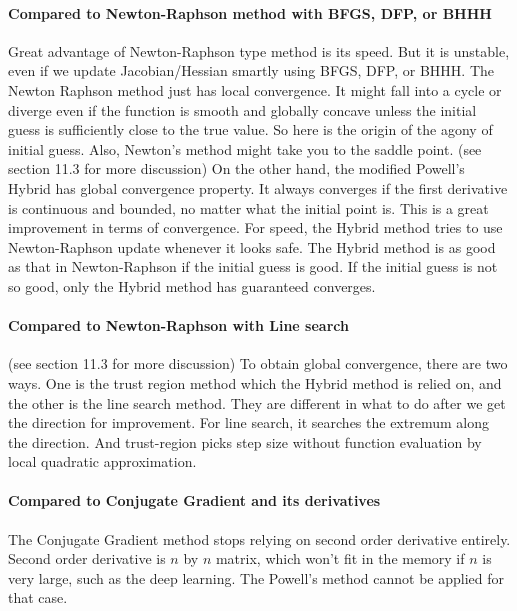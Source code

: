 \documentclass[12pt]{article}
\begin{document}
\paragraph{Compared to Newton-Raphson method with BFGS, DFP, or BHHH} Great advantage of
Newton-Raphson type method is its speed. But it is unstable, even if we update Jacobian/Hessian
smartly using BFGS, DFP, or BHHH. The Newton Raphson method just has local convergence. It
might fall into a cycle or diverge even if the function is smooth and globally concave unless the
initial guess is sufficiently close to the true value. So here is the origin of the agony of
initial guess. Also, Newton's method might take you to the saddle point. (see
\cite{BjorckDahlquist2008} section 11.3 for more discussion) On the other hand, the modified
Powell's Hybrid has global convergence property. It always converges if the first derivative is
continuous and bounded, no matter what the initial point is. This is a great improvement in terms
of convergence. For speed, the Hybrid method tries to use Newton-Raphson update whenever it looks
safe. The Hybrid method is as good as that in Newton-Raphson if the initial guess is good. If the
initial guess is not so good, only the Hybrid method has guaranteed converges.

\paragraph{Compared to Newton-Raphson with Line search} 
(see \cite{BjorckDahlquist2008} section 11.3 for more discussion) To obtain global convergence,
there are two ways. One is the trust region method which the Hybrid method is relied on, and the
other is the line search method. They are different in what to do after we get the direction for
improvement. For line search, it searches the extremum along the direction. And trust-region
picks step size without function evaluation by local quadratic approximation.

\paragraph{Compared to Conjugate Gradient and its derivatives} 
The Conjugate Gradient method stops relying on second order derivative entirely. Second order derivative is $n$  by $n$  matrix, which won't fit in the memory if $n$  is very large, such as the deep learning. The Powell's method cannot be applied for that case.   
\end{document}

